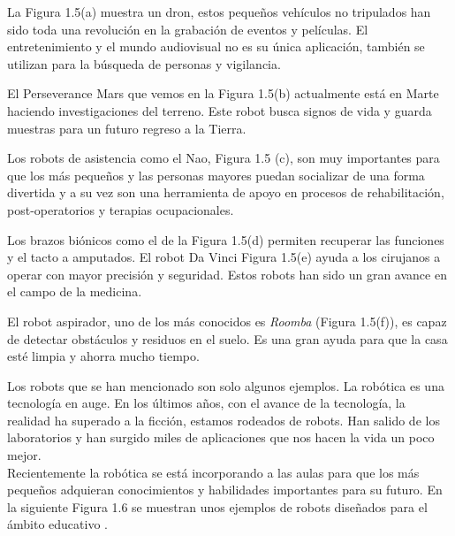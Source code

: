 La Figura 1.5(a) muestra un dron, estos pequeños vehículos no tripulados han sido toda una revolución en la grabación de eventos y películas. El entretenimiento y el mundo audiovisual no es su única aplicación, también se utilizan para la búsqueda de personas y vigilancia. 

El Perseverance Mars que vemos en la Figura 1.5(b) actualmente está en Marte haciendo investigaciones del terreno. Este robot busca signos de vida y guarda muestras para un futuro regreso a la Tierra.

Los robots de asistencia como el Nao, Figura 1.5 (c), son muy importantes para que los más pequeños y las personas mayores puedan socializar de una forma divertida y a su vez son una herramienta de apoyo en procesos de rehabilitación, post-operatorios y terapias ocupacionales.

Los brazos biónicos como el de la Figura 1.5(d) permiten recuperar las funciones y el tacto a amputados. El robot Da Vinci Figura 1.5(e) ayuda a los cirujanos a operar con mayor precisión y seguridad.  Estos robots han sido un gran avance en el campo de la medicina.

El robot aspirador, uno de los más conocidos es \textit{Roomba} (Figura 1.5(f)), es capaz de detectar obstáculos y residuos en el suelo. Es una gran ayuda para que la casa esté limpia y ahorra mucho tiempo.

Los robots que se han mencionado son solo algunos ejemplos. La robótica es una tecnología en auge. En los últimos años, con el avance de la tecnología, la realidad ha superado a la ficción, estamos rodeados de robots. Han salido de los laboratorios y han surgido miles de aplicaciones que nos hacen la vida un poco mejor.
\\
Recientemente la robótica se está incorporando a las aulas para que los más pequeños adquieran conocimientos y habilidades importantes para su futuro. En la siguiente Figura 1.6 se muestran unos ejemplos de robots diseñados para el ámbito educativo \cite{roboticakids}.


